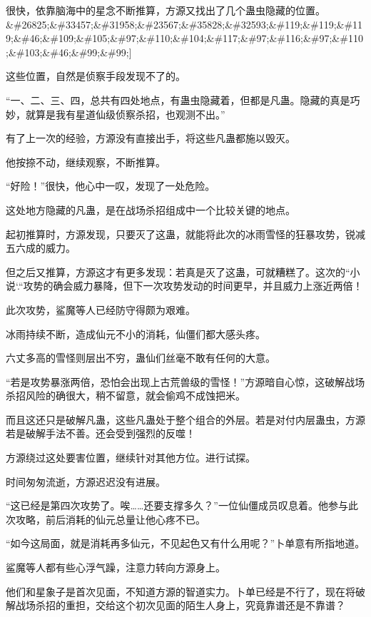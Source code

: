 
\begin{this_body}

很快，依靠脑海中的星念不断推算，方源又找出了几个蛊虫隐藏的位置。\&\#26825;\&\#33457;\&\#31958;\&\#23567;\&\#35828;\&\#32593;\&\#119;\&\#119;\&\#119;\&\#46;\&\#109;\&\#105;\&\#97;\&\#110;\&\#104;\&\#117;\&\#97;\&\#116;\&\#97;\&\#110;\&\#103;\&\#46;\&\#99;\&\#99;]

这些位置，自然是侦察手段发现不了的。

“一、二、三、四，总共有四处地点，有蛊虫隐藏着，但都是凡蛊。隐藏的真是巧妙，就算是我有星道仙级侦察杀招，也观测不出。”

有了上一次的经验，方源没有直接出手，将这些凡蛊都施以毁灭。

他按捺不动，继续观察，不断推算。

“好险！”很快，他心中一叹，发现了一处危险。

这处地方隐藏的凡蛊，是在战场杀招组成中一个比较关键的地点。

起初推算时，方源发现，只要灭了这蛊，就能将此次的冰雨雪怪的狂暴攻势，锐减五六成的威力。

但之后又推算，方源这才有更多发现：若真是灭了这蛊，可就糟糕了。这次的``小说`.``攻势的确会威力暴降，但下一次攻势发动的时间更早，并且威力上涨近两倍！

此次攻势，鲨魔等人已经防守得颇为艰难。

冰雨持续不断，造成仙元不小的消耗，仙僵们都大感头疼。

六丈多高的雪怪则层出不穷，蛊仙们丝毫不敢有任何的大意。

“若是攻势暴涨两倍，恐怕会出现上古荒兽级的雪怪！”方源暗自心惊，这破解战场杀招风险的确很大，稍不留意，就会偷鸡不成蚀把米。

而且这还只是破解凡蛊，这些凡蛊处于整个组合的外层。若是对付内层蛊虫，方源若是破解手法不善。还会受到强烈的反噬！

方源绕过这处要害位置，继续针对其他方位。进行试探。

时间匆匆流逝，方源迟迟没有进展。

“这已经是第四次攻势了。唉……还要支撑多久？”一位仙僵成员叹息着。他参与此次攻略，前后消耗的仙元总量让他心疼不已。

“如今这局面，就是消耗再多仙元，不见起色又有什么用呢？”卜单意有所指地道。

鲨魔等人都有些心浮气躁，注意力转向方源身上。

他们和星象子是首次见面，不知道方源的智道实力。卜单已经是不行了，现在将破解战场杀招的重担，交给这个初次见面的陌生人身上，究竟靠谱还是不靠谱？


\end{this_body}
